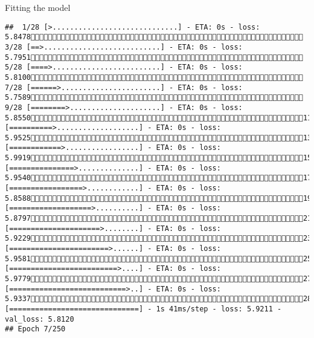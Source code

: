 \documentclass[
  ignorenonframetext,
]{beamer}
\begin{document}
\begin{frame}[fragile]{Fitting the model}
\begin{verbatim}
##  1/28 [>.............................] - ETA: 0s - loss: 5.8478 3/28 [==>...........................] - ETA: 0s - loss: 5.7951 5/28 [====>.........................] - ETA: 0s - loss: 5.8100 7/28 [======>.......................] - ETA: 0s - loss: 5.7589 9/28 [========>.....................] - ETA: 0s - loss: 5.855011/28 [==========>...................] - ETA: 0s - loss: 5.952513/28 [============>.................] - ETA: 0s - loss: 5.991915/28 [===============>..............] - ETA: 0s - loss: 5.954017/28 [=================>............] - ETA: 0s - loss: 5.858819/28 [===================>..........] - ETA: 0s - loss: 5.879721/28 [=====================>........] - ETA: 0s - loss: 5.922923/28 [=======================>......] - ETA: 0s - loss: 5.958125/28 [=========================>....] - ETA: 0s - loss: 5.977927/28 [===========================>..] - ETA: 0s - loss: 5.933728/28 [==============================] - 1s 41ms/step - loss: 5.9211 - val_loss: 5.8120
## Epoch 7/250

\end{verbatim}
\end{frame}
\end{document}
